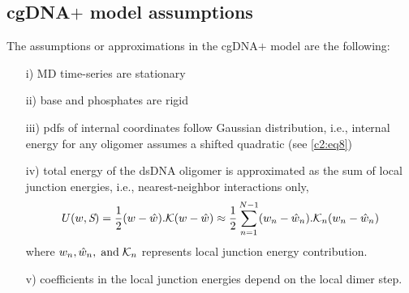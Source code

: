 \subsection{cgDNA$+$ model assumptions}\label{c2:s3_assump}
The assumptions or approximations in the cgDNA$+$ model are the following:
\begin{itemize}
\label{c2:list1}
    \item[i)] MD time-series are stationary 
    \item[ii)] base and phosphates are rigid
    \item[iii)] pdfs of internal coordinates follow Gaussian distribution, i.e., internal energy for any oligomer assumes a shifted quadratic (see \cref{c2:eq8})
    \item[iv)] total energy of the dsDNA oligomer is approximated as the sum of local junction energies, i.e., nearest-neighbor interactions only,  
    \begin{equation}
    U(w,{\textit{S}}) = \frac{1}{2}(w-\hat{w}).{\mathcal K} (w-\hat{w})
\approx \frac{1}{2}\sum_{n=1}^{N-1}
    (w_n-\hat{w}_n).{\mathcal K}_n (w_n-\hat{w}_n)
    \label{c2:eq_sum_of_energy} 
    \end{equation}
    where $w_n, \hat{w}_n, {\;\text{and\;}} {\mathcal K}_n$ represents local junction energy contribution.
    \item[v)] coefficients in the local junction energies depend on the local dimer step.
\end{itemize}

